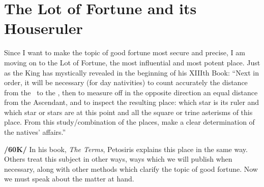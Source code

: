 \section{The Lot of Fortune and its Houseruler}
Since I want to make the topic of good fortune most secure and precise, I am moving on to the Lot of Fortune, the most influential and most potent place. Just as the King has mystically revealed in the beginning of his XIIIth Book: \mnt “Next in order, it will be necessary (for day nativities) to count accurately the distance from the \Sun\, to the \Moon, then to measure off in the opposite direction an equal distance from
the Ascendant, and to inspect the resulting place: which star is its ruler and which star or stars are at this point and all the square or trine asterisms of this place. From this study/combination of the places, make a clear determination of the natives’ affairs.”

\textbf{/60K/} In his book, \textit{The Terms}, Petosiris explains this place in the same way. Others treat this subject
in other ways, ways which we will publish when necessary, along with other methods which clarify the topic of good fortune. Now we must speak about the matter at hand.

\newpage
